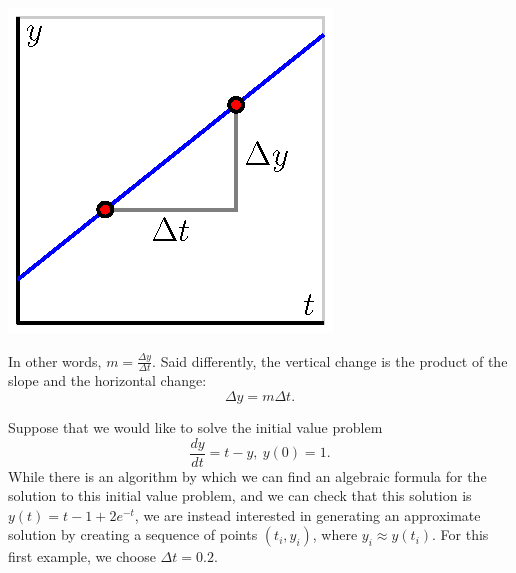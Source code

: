 \begin{center}
  \includegraphics{figures/7_3_slope.eps}
\end{center}
In other words, $m = \frac{\Delta y}{\Delta t}$.  Said differently, the
vertical change is the product of the slope and the horizontal change:
$$\Delta y = m\Delta t.$$

Suppose that we would like to solve the initial value problem
$$
  \frac{dy}{dt} = t - y, \ y(0) = 1.
$$
While there is an algorithm by which we can find an algebraic formula for the solution to this initial value problem, and we can check that this solution is $y(t) = t -1 + 2e^{-t}$, we are instead interested in generating an approximate solution by creating a sequence
of points $(t_i, y_i)$, where $y_i\approx y(t_i)$.  For this first example, we choose $\Delta t = 0.2$.

\medskip


